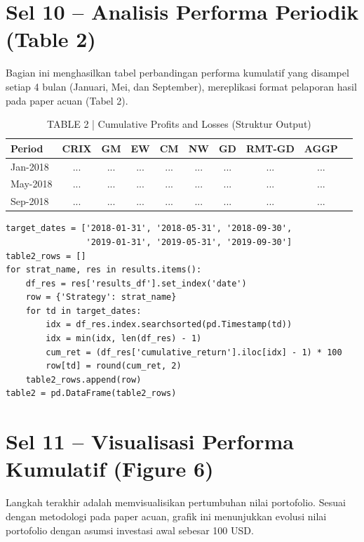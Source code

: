 \documentclass[12pt,a4paper]{article}
\begin{document}
\section{Sel 10 -- Analisis Performa Periodik (Table 2)}
Bagian ini menghasilkan tabel perbandingan performa kumulatif yang disampel setiap 4 bulan (Januari, Mei, dan September), mereplikasi format pelaporan hasil pada paper acuan (Tabel 2).

\begin{table}[h]
    \centering
    \footnotesize
    \caption{TABLE 2 | Cumulative Profits and Losses (Struktur Output)}
    \begin{tabular}{lccccccccc}
        \toprule
        Period & CRIX & GM & EW & CM & NW & GD & RMT-GD & AGGP \\
        \midrule
        Jan-2018 & ... & ... & ... & ... & ... & ... & ... & ... \\
        May-2018 & ... & ... & ... & ... & ... & ... & ... & ... \\
        Sep-2018 & ... & ... & ... & ... & ... & ... & ... & ... \\
        \bottomrule
    \end{tabular}
\end{table}

\begin{lstlisting}[caption={Kalkulasi Profit/Loss Kumulatif Periodik (Jan, Mei, Sep)}]
target_dates = ['2018-01-31', '2018-05-31', '2018-09-30', 
                '2019-01-31', '2019-05-31', '2019-09-30']
table2_rows = []
for strat_name, res in results.items():
    df_res = res['results_df'].set_index('date')
    row = {'Strategy': strat_name}
    for td in target_dates:
        idx = df_res.index.searchsorted(pd.Timestamp(td))
        idx = min(idx, len(df_res) - 1)
        cum_ret = (df_res['cumulative_return'].iloc[idx] - 1) * 100
        row[td] = round(cum_ret, 2)
    table2_rows.append(row)
table2 = pd.DataFrame(table2_rows)
\end{lstlisting}

\section{Sel 11 -- Visualisasi Performa Kumulatif (Figure 6)}
Langkah terakhir adalah memvisualisikan pertumbuhan nilai portofolio. Sesuai dengan metodologi pada paper acuan, grafik ini menunjukkan evolusi nilai portofolio dengan asumsi investasi awal sebesar 100 USD.
\end{document}
